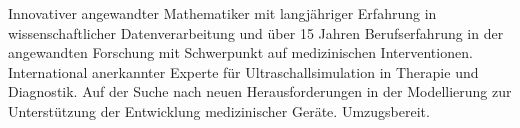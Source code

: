\documentclass[german, print]{cv-style-wide-de}
\begin{document}
\begingroup
  \setlength{\leftskip}{0cm}
  \setlength{\rightskip}{0.2cm}
  \setlength{\parfillskip}{0pt plus 1fil}
%
%
%
\setul{0.5ex}{0.4pt}%
Innovativer angewandter Mathematiker mit langjähriger Erfahrung in wissenschaftlicher Datenverarbeitung und über 15 Jahren Berufserfahrung in der angewandten Forschung mit Schwerpunkt auf medizinischen Interventionen. International anerkannter Experte für Ultraschallsimulation in Therapie und Diagnostik. Auf der Suche nach neuen Herausforderungen in der Modellierung zur Unterstützung der Entwicklung medizinischer Geräte. Umzugsbereit.
\end{document}
